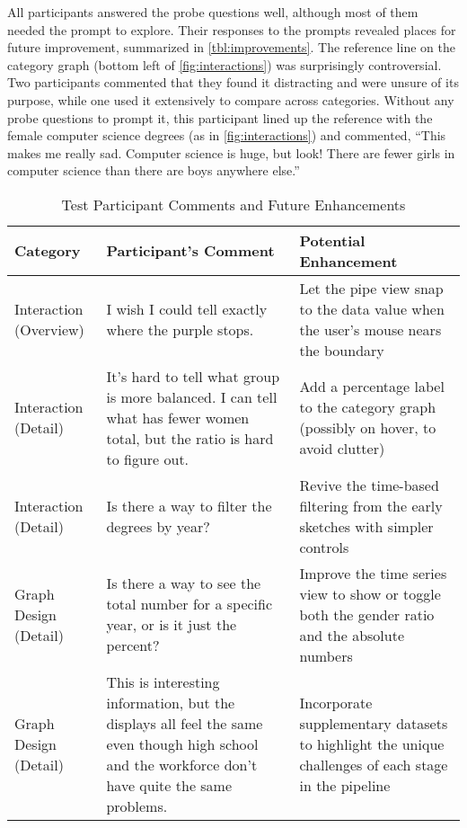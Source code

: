 All participants answered the probe questions well, although most of them needed the prompt to explore. Their responses to the prompts revealed places for future improvement, summarized in \autoref{tbl:improvements}. The reference line on the category graph (bottom left of \autoref{fig:interactions}) was surprisingly controversial. Two participants commented that they found it distracting and were unsure of its purpose, while one used it extensively to compare across categories. Without any probe questions to prompt it, this participant lined up the reference with the female computer science degrees (as in \autoref{fig:interactions}) and commented, ``This makes me really sad. Computer science is huge, but look! There are fewer girls in computer science than there are boys anywhere else.''

\begin{table}
  \centering

  \begin{tabular}{p{0.9in}p{2.3in}p{2.3in}}\hline
    \textbf{Category} & \textbf{Participant's Comment} & \textbf{Potential Enhancement} \\ \hline
    Interaction (Overview)
      & I wish I could tell exactly where the purple stops.
      & Let the pipe view snap to the data value when the user's mouse nears the boundary \\
    Interaction (Detail)
      & It's hard to tell what group is more balanced. I can tell what has fewer women total, but the ratio is hard to figure out.
      & Add a percentage label to the category graph (possibly on hover, to avoid clutter) \\
    Interaction (Detail)
      & Is there a way to filter the degrees by year?
      & Revive the time-based filtering from the early sketches with simpler controls \\
    Graph Design (Detail)
      & Is there a way to see the total number for a specific year, or is it just the percent?
      & Improve the time series view to show or toggle both the gender ratio and the absolute numbers \\
    Graph Design (Detail)
      & This is interesting information, but the displays all feel the same even though high school and the workforce don't have quite the same problems.
      & Incorporate supplementary datasets to highlight the unique challenges of each stage in the pipeline \\ \hline
  \end{tabular}

  \caption{Test Participant Comments and Future Enhancements}
  \label{tbl:improvements}
\end{table}

